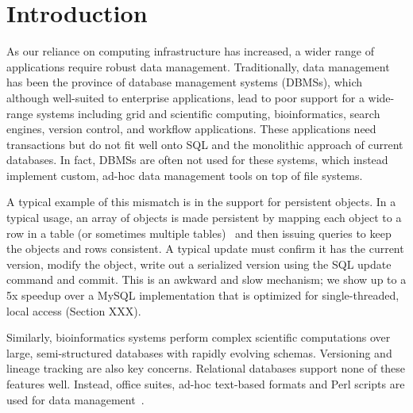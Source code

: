 \documentclass[letterpaper,twocolumn,10pt]{article}
\begin{document}




\section{Introduction}

As our reliance on computing infrastructure has increased, a wider range of 
applications require robust data management.  Traditionally, data management
has been the province of database management systems (DBMSs), which although
well-suited to enterprise applications, lead to poor support for a
wide-range systems including grid and scientific computing,
bioinformatics, search engines, version control, and workflow
applications.  These applications need transactions but do not fit well
onto SQL and the monolithic approach of current databases.  In
fact, DBMSs are often not used for these systems, which instead
implement custom, ad-hoc data management tools on top of file
systems.

A typical example of this mismatch is in the support for
persistent objects.
In a typical usage, an array of objects is made persistent by
mapping each object to a row in a table (or sometimes multiple
tables)~\cite{xxx} and then issuing queries to keep the objects and
rows consistent. A typical update must confirm it has the current
version, modify the object, write out a serialized version using the
SQL update command and commit. This is an awkward and slow mechanism;
we show up to a 5x speedup over a MySQL implementation that is
optimized for single-threaded, local access (Section XXX).

Similarly, bioinformatics systems perform complex scientific
computations over large, semi-structured databases with rapidly evolving schemas.  Versioning and
lineage tracking are also key concerns.  Relational databases support
none of these features well.  Instead, office suites, ad-hoc
text-based formats and Perl scripts are used for data management~\cite{perl, excel}.
\end{document}
